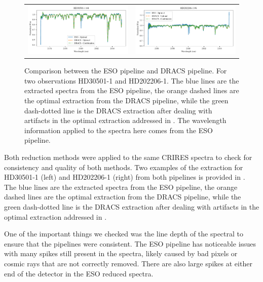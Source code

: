 \begin{figure}
\begin{tabular}{cc}
        \includegraphics[width=0.5\linewidth]{figures/reduction/pipeline_compare/pipeline_compare_HD30501-1_chip_4} & \includegraphics[width=0.5\linewidth]{figures/reduction/pipeline_compare/pipeline_compare_HD202206-1_chip_4}\\
    \end{tabular}
    \caption{Comparison between the ESO pipeline and DRACS pipeline. For two observations HD30501-1 and HD202206-1. The blue lines are the extracted spectra from the ESO pipeline, the orange dashed lines are the optimal extraction from the DRACS pipeline, while the green dash-dotted line is the DRACS extraction after dealing with artifacts in the optimal extraction addressed in . The wavelength information applied to the spectra here comes from the ESO pipeline.}
    \label{fig:reduction-comparison}
\end{figure}

Both reduction methods were applied to the same CRIRES spectra to check for consistency and quality of both methods. Two examples of the extraction for HD30501-1 (left) and HD202206-1 (right) from both pipelines is provided in . The blue lines are the extracted spectra from the ESO pipeline, the orange dashed lines are the optimal extraction from the DRACS pipeline, while the green dash-dotted line is the DRACS extraction after dealing with artifacts in the optimal extraction addressed in . 

One of the important things we checked was the line depth of the spectral to ensure that the pipelines were consistent. The ESO pipeline has noticeable issues with many spikes still present in the spectra, likely caused by bad pixels or cosmic rays that are not correctly removed. There are also large spikes at either end of the detector in the ESO reduced spectra.  


